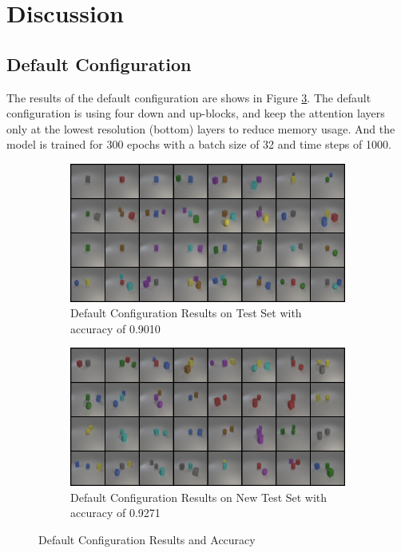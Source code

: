 \section{Discussion}

\subsection{Default Configuration}

The results of the default configuration are shows in Figure \ref{fig:default}.
The default configuration is using four down and up-blocks, and keep the attention layers only at the lowest resolution (bottom) layers to reduce memory usage.
And the model is trained for 300 epochs with a batch size of 32 and time steps of 1000.

\begin{figure}[H]
    \centering
    \begin{subfigure}{0.48\textwidth}
        \centering
        \includegraphics[width=\textwidth]{figures/default_test.png}
        \caption{Default Configuration Results on Test Set with accuracy of 0.9010}
        \label{fig:default_test}
    \end{subfigure}
    \hfill
    \begin{subfigure}{0.48\textwidth}
        \centering
        \includegraphics[width=\textwidth]{figures/default_new_test.png}
        \caption{Default Configuration Results on New Test Set with accuracy of 0.9271}
        \label{fig:default_new_test}
    \end{subfigure}
    \caption{Default Configuration Results and Accuracy}
    \label{fig:default}
\end{figure}

